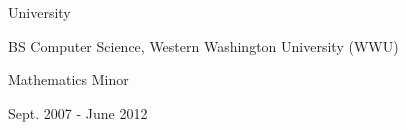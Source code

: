 \documentclass{article}
\newenvironment{mylist}[2]{
  \subsubsection*{#1}
  \begin{multicols}{#2}
  \small
  \begin{list}{}{}
   \setlength{\topsep}{0pt}
   \setlength{\itemsep}{1pt}
   \setlength{\parskip}{0pt}
   \setlength{\parsep}{0pt}}{\end{list}\end{multicols}\normalsize}
\newenvironment{*mylist}[2]{
  \subsubsection*{#1\hfill\small#2}
  \small
  \begin{list}{}{}
   \setlength{\topsep}{0pt}
   \setlength{\itemsep}{1pt}
   \setlength{\parskip}{0pt}
   \setlength{\parsep}{0pt}}{\end{list}\normalsize}
\newcommand{\LUx}[1]{{\bf\em #1}}
\begin{document}
\begin{comment}
\hspace{-.08in}\begin{tabular}{lrl}
  &&\\
  Sensor Systems and Light Pollution Course&\LUx{Python}&\\
  Spinqr - Shamir Secret QR Sharing &\LUx{Python}&\\
  Probabilistic-Program Profiler and Evaluator Harness&\LUx{SLURM, PonyORM, Python}&\\
  Probabilistic WiFi Geolocation&\LUx{Figaro, Javascript}&\\
  Cryptographic Distributed Virtual System Vectors &\LUx{\LaTeX, Haskell}&\\
  Distributed Fully Homomorphic Encryption System &\LUx{Hadoop, Python}&\\
  Concurrent Elliptic Curve Cryptography Module&\LUx{Erlang, Sagemath}&\\
  Analysis of Subordinating and Coordinating Conjunctions&\LUx{R, Perl}&\\
  AdaRailz Concurrent Model Train Control System&\LUx{Ada}&\\
  TwixT AI Agent and UI&\LUx{Java}&\\
  Fractal Art Generator \& Image Manipulation Program &\LUx{C\#}&\\
  Text-Based Adventure Game&\LUx{C++}&\\
  Unix Shell & \LUx{C}&\\
  Liars Dice Game Server & \LUx{C}&\\
  Petrographic Mineral Identification Database Design Documents &&\\%
\end{tabular}
\end{comment}
\normalsize

\pagebreak{}

\begin{comment}
\begin{mylist}{Post-Graduation Online Coursework :}{2}
\item Functional Programming in Scala
\item Intro to Cryptography %
\item Applied Cryptography  %
\end{mylist}
\end{comment}

\begin{*mylist}{University}{}
\item BS Computer Science, Western Washington University (WWU) 
\item Mathematics Minor
\item Sept. 2007 - June 2012
\end{*mylist}
 
\end{document}
